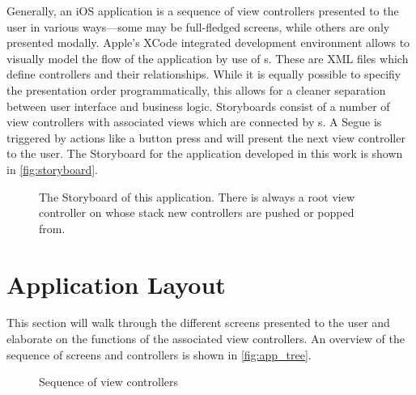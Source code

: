 Generally, an iOS application is a sequence of view controllers presented to the
user in various ways---some may be full-fledged screens, while others are only
presented modally. Apple's XCode integrated development environment allows to
visually model the flow of the application by use of s. These
are XML files which define controllers and their relationships. While
it is equally possible to specifiy the presentation order programmatically, this
allows for a cleaner separation between user interface and business logic.
Storyboards consist of a number of view controllers with associated views which
are connected by s. A Segue is triggered by actions like a button
press and will present the next view controller to the user. The Storyboard for
the application developed in this work is shown in \autoref{fig:storyboard}.

\begin{figure}[h]
   {\centering      
      
      \caption[Storyboard example]{The Storyboard of this application. There is
      always a root view controller on whose stack new controllers are pushed or popped from.}
   \label{fig:storyboard}}
\end{figure}

\FloatBarrier

\section{Application Layout}

This section will walk through the different screens presented to the user and
elaborate on the functions of the associated view controllers. An overview of
the sequence of screens and controllers is shown in \autoref{fig:app_tree}.

\begin{figure}[h]
   {\centering      
      
   \caption{Sequence of view controllers}
   \label{fig:app_tree}}
\end{figure}

\FloatBarrier

\newcommand*{\button}[1]{
   \tikzexternaldisable
   \tikz[baseline=-.5ex]{\node[inner sep=1pt,outer sep=0,draw,rounded corners=2pt]{\small\texttt{#1}};}
   \tikzexternalenable
}

\newcommand*{\nofloat}[2]{
   \begin{center}
      \fbox{
         \texttt{[image: \#1]}
      }
      \captionof{figure}{#2}
   \end{center}
}

